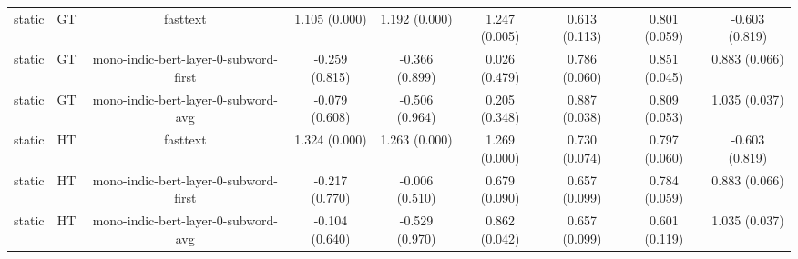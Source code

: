 \begin{sidewaystable}[htb]
\begin{tabular}{@{}ccccccccc@{}}
        static & GT & fasttext & 1.105 (0.000) & 1.192 (0.000) & 1.247 (0.005) & 0.613 (0.113) & 0.801 (0.059) & -0.603 (0.819) \\
        static & GT & mono-indic-bert-layer-0-subword-first & -0.259 (0.815) & -0.366 (0.899) & 0.026 (0.479) & 0.786 (0.060) & 0.851 (0.045) & 0.883 (0.066) \\
        static & GT & mono-indic-bert-layer-0-subword-avg & -0.079 (0.608) & -0.506 (0.964) & 0.205 (0.348) & 0.887 (0.038) & 0.809 (0.053) & 1.035 (0.037) \\
        static & HT & fasttext & 1.324 (0.000) & 1.263 (0.000) & 1.269 (0.000) & 0.730 (0.074) & 0.797 (0.060) & -0.603 (0.819) \\
        static & HT & mono-indic-bert-layer-0-subword-first & -0.217 (0.770) & -0.006 (0.510) & 0.679 (0.090) & 0.657 (0.099) & 0.784 (0.059) & 0.883 (0.066) \\
        static & HT & mono-indic-bert-layer-0-subword-avg & -0.104 (0.640) & -0.529 (0.970) & 0.862 (0.042) & 0.657 (0.099) & 0.601 (0.119) & 1.035 (0.037) \\
        \bottomrule
    \end{tabular}
\end{sidewaystable}